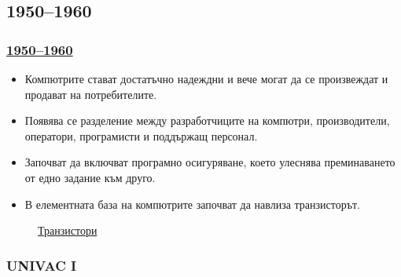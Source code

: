 \documentclass[ignorenonframetext, hyperref=unicode]{beamer}
\begin{document}
\subsection{1950--1960}

\begin{frame}
\frametitle{\href{http://en.wikipedia.org/wiki/History_of_computing_hardware}{1950--1960}}
\begin{itemize}
  \item Компютрите стават достатъчно надеждни и вече могат да се произвеждат и
  продават на потребителите.
  \item Появява се разделение между разработчиците на компютри, производители,
  оператори, програмисти и поддържащ персонал.
  \item Започват да включват програмно осигуряване, което улеснява преминаването
  от едно задание към друго.
  \item В елементната база на компютрите започват да навлиза транзисторът.
\end{itemize}
\begin{figure}[h]
\center
{}
\caption{\href{http://en.wikipedia.org/wiki/Transistor}{Транзистори}}
\end{figure}
\end{frame}

\subsubsection{UNIVAC I}
\end{document}
